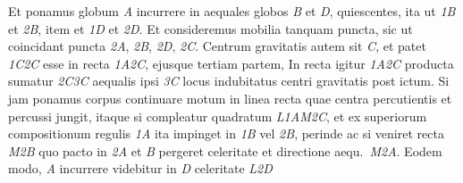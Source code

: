 Et%
%
ponamus globum \textit{A} incurrere in aequales globos%
\protect{} \textit{B} et \textit{D}, quiescentes, ita ut  
%
%
\textit{{\scriptsize1}B} et \textit{{\scriptsize2}B}, item et \textit{{\scriptsize1}D} et \textit{{\scriptsize2}D}.  
%
Et consideremus mobilia%
\protect{} tanquam puncta, 
%
 sic ut coincidant puncta \textit{{\scriptsize2}A}, \textit{{\scriptsize2}B}, \textit{{\scriptsize2}D}, \textit{{\scriptsize2}C}.  
%
Centrum gravitatis\protect{} autem sit \textit{C}, et patet  
%
\textit{{\scriptsize1}C{\scriptsize2}C} esse in recta \textit{{\scriptsize1}A{\scriptsize2}C}, ejusque tertiam partem,  
%
%
 In recta igitur \textit{{\scriptsize1}A{\scriptsize2}C} producta sumatur \textit{{\scriptsize2}C{\scriptsize3}C} aequalis ipsi  
%
%
\textit{{\scriptsize3}C} locus indubitatus centri gravitatis%
\protect{} post ictum\protect{}.  
%
Si jam ponamus corpus 
%
 continuare motum in linea recta quae centra percutientis  
%
et percussi jungit\lbrack,\rbrack%
\protect{} itaque si compleatur quadratum \textit{L{\scriptsize1}AM{\scriptsize2}C}, 
%
 et ex superiorum compositionum regulis%
\protect{} \textit{{\scriptsize1}A} ita impinget in \textit{{\scriptsize1}B} 
%
 vel \textit{{\scriptsize2}B}, perinde ac si veniret recta \textit{M{\scriptsize2}B} quo pacto  
%
%
in \textit{{\scriptsize2}A} et \textit{B} pergeret celeritate et directione  
%
%
aequ.\ \textit{M{\scriptsize2}A}. Eodem modo, \textit{A} incurrere videbitur in \textit{D} celeritate \textit{L{\scriptsize2}D} 
